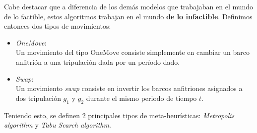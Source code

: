 \documentclass[letter, 10pt]{article}
\begin{document}
Cabe destacar que a diferencia de los demás modelos que trabajaban en el mundo de lo factible, estos algoritmos trabajan en el mundo \textbf{de lo infactible}.
Definimos entonces dos tipos de movimientos:
\begin{itemize}
    \item \textit{OneMove}: \\
    Un movimiento del tipo OneMove consiste simplemente en cambiar un barco anfitrión a una tripulación dada por un período dado.
    
    \item \textit{Swap}: \\
    Un movimiento \textit{swap} consiste en invertir los barcos anfitriones asignados a dos tripulación $g_1$ y $g_2$ durante el mismo periodo de tiempo $t$. 
\end{itemize}

Teniendo esto, se definen 2 principales tipos de meta-heurísticas: \textit{Metropolis algorithm} y \textit{Tabu Search algorithm}. 
\end{document}
